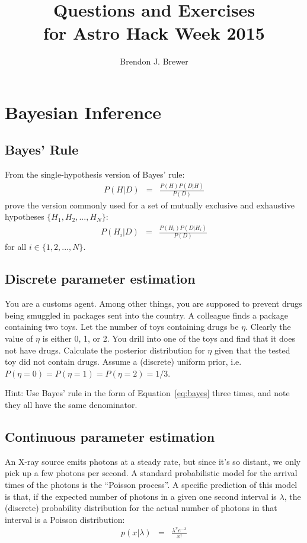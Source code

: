 \documentclass[a4paper, 11pt]{article}
\title{Questions and Exercises\\
for Astro Hack Week 2015}
\author{Brendon J. Brewer}
\begin{document}
\maketitle

\section{Bayesian Inference}


\subsection{Bayes' Rule}
From the single-hypothesis version of Bayes' rule:
\begin{eqnarray}
P(H|D) &=& \frac{P(H)P(D|H)}{P(D)}
\end{eqnarray}
prove the version commonly used for a set of mutually exclusive and exhaustive
hypotheses $\{H_1, H_2, ..., H_N\}$:
\begin{eqnarray}
P(H_i|D) &=& \frac{P(H_i)P(D|H_i)}{P(D)}\label{eq:bayes}
\end{eqnarray}
for all $i \in \{1, 2, ..., N\}$.

\subsection{Discrete parameter estimation}
You are a customs agent. Among other things, you are supposed to prevent
drugs being smuggled in packages sent into the country. A colleague finds a
package containing two toys. Let the number of toys containing drugs be
$\eta$. Clearly the value of $\eta$ is either 0, 1, or 2. You drill into
one of the toys and find that it does not have drugs.
Calculate the posterior distribution for $\eta$ given that the tested
toy did not contain drugs. Assume a (discrete) uniform prior, i.e.
$P(\eta=0) = P(\eta=1) = P(\eta=2) = 1/3$.

{\tiny Hint: Use Bayes' rule in the form of Equation~\ref{eq:bayes}
three times, and note they all have the same denominator.}

\subsection{Continuous parameter estimation}
An X-ray source emits photons at a steady rate, but since it's so distant, we
only pick up a few photons per second.
A standard probabilistic model for the arrival times of the photons is the
``Poisson process''. A specific prediction of this model is that, if the
expected number of photons in a given one second interval
is $\lambda$, the (discrete) probability distribution for the actual number of photons in that interval is a Poisson distribution:
\begin{eqnarray}
p(x | \lambda) &=& \frac{\lambda^x e^{-\lambda}}{x!}
\end{eqnarray}
\end{document}

